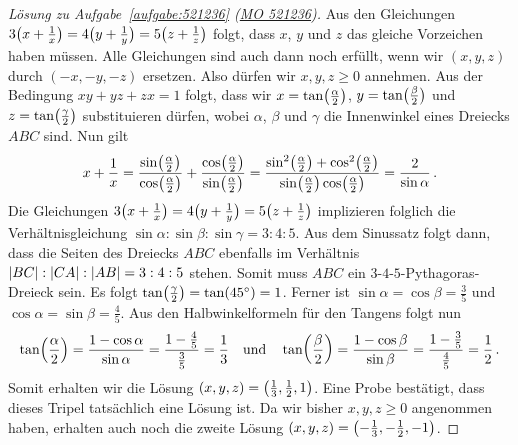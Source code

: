 \begin{proof}[Lösung zu Aufgabe~\ref{aufgabe:521236} \textmd{(\href{https://www.mathematik-olympiaden.de/moev/index.php?option=com_download&thema=a&datei=A52123b.pdf&format=raw}{MO 521236})}]
	Aus den Gleichungen $3\parens[\big]{x+\frac1x}=4\parens[\big]{y+\frac1y}=5\parens[\big]{z+\frac1z}$ folgt, dass $x$, $y$ und $z$ das gleiche Vorzeichen haben müssen. Alle Gleichungen sind auch dann noch erfüllt, wenn wir $(x,y,z)$ durch $(-x,-y,-z)$ ersetzen. Also dürfen wir $x,y,z\geqslant 0$ annehmen. Aus der Bedingung $xy+yz+zx=1$ folgt, dass wir $x=\tan\parens[\big]{\frac{\alpha}2}$, $y=\tan\parens[\big]{\frac{\beta}2}$ und $z=\tan\parens[\big]{\frac{\gamma}2}$ substituieren dürfen, wobei $\alpha$, $\beta$ und $\gamma$ die Innenwinkel eines Dreiecks $ABC$ sind. Nun gilt
	\begin{equation*}
		x+\frac 1x=\frac{\sin \parens[\big]{\frac{\alpha}2}}{\cos\parens[\big]{\frac{\alpha}2}}+\frac{\cos\parens[\big]{\frac{\alpha}2}}{\sin\parens[\big]{\frac{\alpha}2}}=\frac{\sin^2\parens[\big]{\frac{\alpha}2}+\cos^2\parens[\big]{\frac{\alpha}2}}{\sin \parens[\big]{\frac{\alpha}2}\cos\parens[\big]{\frac{\alpha}2}}=\frac2{\sin\alpha}\,.
	\end{equation*}
	Die Gleichungen $3\parens[\big]{x+\frac1x}=4\parens[\big]{y+\frac1y}=5\parens[\big]{z+\frac1z}$ implizieren folglich die Verhältnisgleichung $\sin\alpha:\sin\beta:\sin\gamma=3:4:5$. Aus dem Sinussatz folgt dann, dass die Seiten des Dreiecks $ABC$ ebenfalls im Verhältnis $\abs*{BC}:\abs*{CA}:\abs*{AB}=3:4:5$ stehen. Somit muss $ABC$ ein $3$-$4$-$5$-Pythagoras-Dreieck sein. Es folgt $\tan \parens[\big]{\frac{\gamma}2}=\tan(45^\circ)=1$. Ferner ist $\sin\alpha=\cos\beta=\frac 35$ und $\cos\alpha=\sin\beta=\frac 45$. Aus den Halbwinkelformeln für den Tangens folgt nun
	\begin{equation*}
		\tan \parens*{\frac{\alpha}2}=\frac{1-\cos\alpha}{\sin\alpha}=\frac{1-\frac{4}{5}}{\frac{3}{5}}=\frac13\quad \text{und}\quad \tan \parens*{\frac{\beta}2}=\frac{1-\cos\beta}{\sin\beta}=\frac{1-\frac{3}{5}}{\frac{4}{5}}=\frac12\,.
	\end{equation*}
	Somit erhalten wir die Lösung $(x,y,z)=\parens[\big]{\frac13,\frac12,1}$. Eine Probe bestätigt, dass dieses Tripel tatsächlich eine Lösung ist. Da wir bisher $x,y,z\geqslant 0$ angenommen haben, erhalten auch noch die zweite Lösung $(x,y,z)=\parens[\big]{-\frac13,-\frac12,-1}$.
\end{proof}

